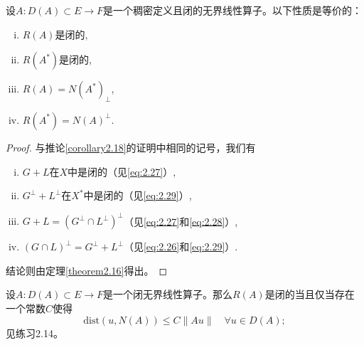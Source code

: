 \begin{theorem}\label{theorem2.19}
设$A:D(A) \subset E \to F$是一个稠密定义且闭的无界线性算子。以下性质是等价的：
\begin{enumerate}[(i)]
    \item $R(A)$是闭的,
    \item $R(A^*)$是闭的,
    \item $R(A) = N(A^*)_\perp$,
    \item $R(A^*) = N(A)^\perp$.
\end{enumerate}
\end{theorem}
\begin{proof}
与推论\ref{corollary2.18}的证明中相同的记号，我们有
\begin{enumerate}[(i)]
    \item $G+L$在$X$中是闭的（见\eqref{eq:2.27}）,
    \item $G^\perp+L^\perp$在$X^*$中是闭的（见\eqref{eq:2.29}）,
    \item $G+L = (G^\perp \cap L^\perp)^\perp$（见\eqref{eq:2.27}和\eqref{eq:2.28}）,
    \item $(G \cap L)^\perp = G^\perp+L^\perp$（见\eqref{eq:2.26}和\eqref{eq:2.29}）.
\end{enumerate}
结论则由定理\ref{theorem2.16}得出。
\end{proof}

\begin{remark}
设$A:D(A) \subset E \to F$是一个闭无界线性算子。那么$R(A)$是闭的当且仅当存在一个常数$C$使得
\[ \text{dist}(u, N(A)) \leq C\|Au\| \quad \forall u \in D(A); \]
见练习2.14。
\end{remark}

